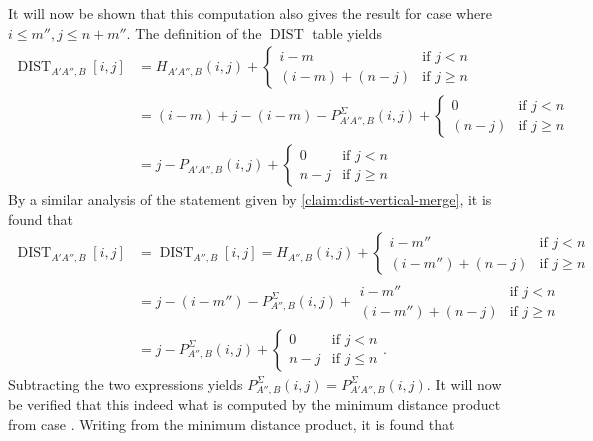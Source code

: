 \documentclass[twoside,11pt,openright]{report}
\newcommand{\DIST}{\operatorname{DIST}}
\newcommand*{\circled}[1]{\tikz[baseline=(char.base)]{
                          \node[shape=circle,draw,inner sep=2pt] (char) {#1};}}
\begin{document}
It will now be shown that this computation also gives the result for case \circled{1} where $i \leq m'', j \leq n + m''$. The definition of the $\DIST$ table yields
\begin{align*}
  \DIST_{A'A'',B}[i, j] &= H_{A'A'',B}(i, j) + \left\{
    \begin{array}{ll}
      i - m             & \text{if } j < n \\
      (i - m) + (n - j) & \text{if } j \geq n
    \end{array}
  \right. \\
  &= (i - m) + j - (i - m) - P_{A'A'',B}^\Sigma(i, j) + \left\{
    \begin{array}{ll}
      0             & \text{if } j < n \\
      (n - j)       & \text{if } j \geq n
    \end{array}
  \right. \\
  &= j - P_{A'A'',B}(i, j) + \left\{
    \begin{array}{ll}
      0             & \text{if } j < n \\
      n - j         & \text{if } j \geq n
    \end{array}
  \right.
\end{align*}
By a similar analysis of the statement given by \cref{claim:dist-vertical-merge}, it is found that
\begin{align*}
  \DIST_{A'A'',B}[i, j] &= \DIST_{A'',B}[i, j] = H_{A'',B}(i, j) + \left\{
    \begin{array}{ll}
      i - m''             & \text{if } j < n \\
      (i - m'') + (n - j) & \text{if } j \geq n
    \end{array}
  \right. \\
  &= j - (i - m'') - P_{A'',B}^{\Sigma}(i, j) +
      \begin{array}{ll}
        i - m''             & \text{if } j < n \\
        (i - m'') + (n - j) & \text{if } j \geq n
      \end{array} \\
  &= j - P_{A'',B}^{\Sigma}(i, j) + \left\{
    \begin{array}{ll}
      0             & \text{if } j < n \\
      n - j         & \text{if } j \leq n
    \end{array}
  \right. .
\end{align*}
Subtracting the two expressions yields $P_{A'',B}^{\Sigma}(i, j) = P_{A'A'',B}^{\Sigma}(i, j)$. It will now be verified that this indeed what is computed by the minimum distance product from case \circled{3}. Writing from the minimum distance product, it is found that
\end{document}
